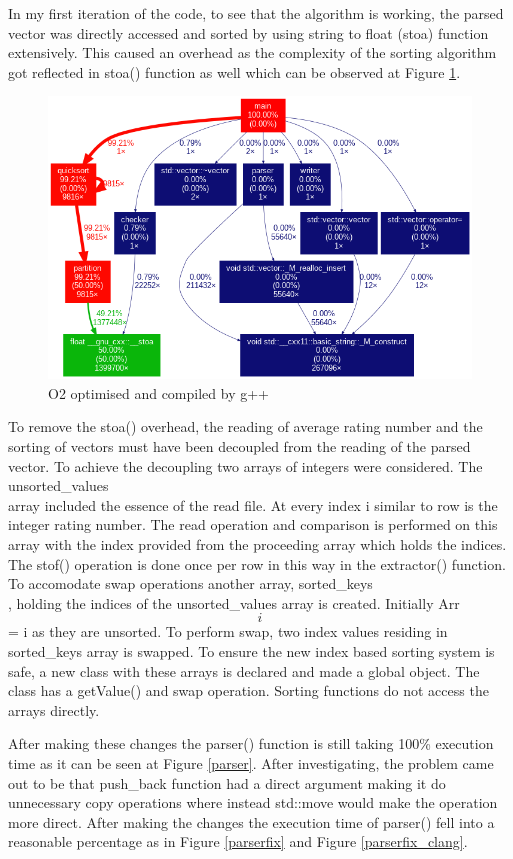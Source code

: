 In my first iteration of the code, to see that the algorithm is working, the parsed vector was directly accessed and sorted by using string to float (stoa) function extensively. This caused an overhead as the complexity of the sorting algorithm got reflected in stoa() function as well which can be observed at Figure \ref{stoa}.
\begin{figure}[H]
\begin{center}
\leavevmode
\includegraphics[width=350pt]{output_o2optimised.png}
\caption{O2 optimised and compiled by g++}
\label{stoa}
\end{center}
\end{figure}

To remove the stoa() overhead, the reading of average rating number and the sorting of vectors must have been decoupled from the reading of the parsed vector. To achieve the decoupling two arrays of integers were considered. The unsorted\_values\[\] array included the essence of the read file. At every index i similar to row is the integer rating number. The read operation and comparison is performed on this array with the index provided from the proceeding array which holds the indices. The stof() operation is done once per row in this way in the extractor() function.
To accomodate swap operations another array, sorted\_keys\[\], holding the indices of the unsorted\_values array is created. Initially Arr\[i\] = i as they are unsorted. To perform swap, two index values residing in sorted\_keys array is swapped.  
To ensure the new index based sorting system is safe, a new class with these arrays is declared and made a global object. The class has a getValue() and swap operation. Sorting functions do not access the arrays directly. 

After making these changes the parser() function is still taking 100\% execution time as it can be seen at Figure \ref{parser}. After investigating, the problem came out to be that push\_back function had a direct argument making it do unnecessary copy operations where instead std::move would make the operation more direct. After making the changes the execution time of parser() fell into a reasonable percentage as in Figure \ref{parserfix} and Figure \ref{parserfix_clang}.  


